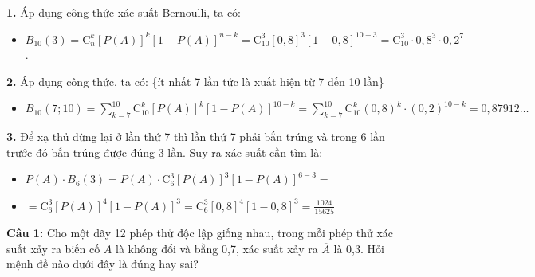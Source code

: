 \documentclass[12pt, a4paper]{article}
\newcommand{\Comb}[2]{\mathrm{C}_{#1}^{#2}}
\begin{document}
		
		\noindent \textbf{1.} Áp dụng công thức xác suất Bernoulli, ta có:
		\begin{itemize}
			\item \(B_{10}(3) = \Comb{n}{k} \left[ P(A) \right]^k \left[ 1 - P(A) \right]^{n-k} = \Comb{10}{3} \left[ 0,8 \right]^3 \left[ 1 - 0,8 \right]^{10-3} = \Comb{10}{3} \cdot 0,8^3 \cdot 0,2^7\).
		\end{itemize}
		
		\noindent \textbf{2.} Áp dụng công thức, ta có: \{ít nhất 7 lần tức là xuất hiện từ 7 đến 10 lần\}
		\begin{itemize}
			\item \(B_{10}(7;10) = \sum_{k=7}^{10} \Comb{10}{k} \left[ P(A) \right]^k \left[ 1 - P(A) \right]^{10-k} = \sum_{k=7}^{10} \Comb{10}{k} (0,8)^k \cdot (0,2)^{10-k} = 0,87912\dots\)
		\end{itemize}
		
		\noindent \textbf{3.} Để xạ thủ dừng lại ở lần thứ 7 thì lần thứ 7 phải bắn trúng và trong 6 lần trước đó bắn trúng được đúng 3 lần. Suy ra xác suất cần tìm là:
		\begin{itemize}
			\item \(P(A) \cdot B_6(3) = P(A) \cdot \Comb{6}{3} \left[ P(A) \right]^3 \left[ 1 - P(A) \right]^{6-3} =\)
			\item \(= \Comb{6}{3} \left[ P(A) \right]^4 \left[ 1 - P(A) \right]^3 = \Comb{6}{3} \left[ 0,8 \right]^4 \left[ 1 - 0,8 \right]^3 = \frac{1024}{15625}\)
		\end{itemize}
		\vspace{0.5cm}
		
		\noindent \textbf{Câu 1:} Cho một dãy 12 phép thử độc lập giống nhau, trong mỗi phép thử xác suất xảy ra biến cố \(A\) là không đổi và bằng 0,7, xác suất xảy ra \(\overline{A}\) là 0,3. Hỏi mệnh đề nào dưới đây là đúng hay sai?
		
		\vspace{0.3cm}
		
\end{document}
